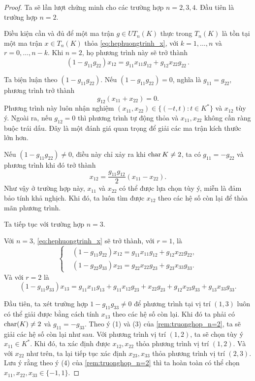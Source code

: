 \begin{proof}

Ta sẽ lần lượt chứng minh cho các trường hợp $n=2,3,4.$ Đầu tiên là trường hợp $n=2$.

    Điều kiện cần và đủ để một ma trận $g\in UT_n(K)$ thực trong $T_n(K)$ là tồn tại một ma trận $x\in T_n(K)$ thỏa \cref{eq:hephuongtrinh_x},
    với \(k = 1,\dots,n\) và \(r = 0,\dots,n-k\). Khi \(n = 2\), họ phương trình này sẽ trở thành
    \[
        (1 - g_{11} g_{22}) x_{12} = g_{11} x_{11} g_{12} + g_{12} x_{22} g_{22}\,.
    \]
    
    Ta biện luận theo \((1 - g_{11} g_{22})\). Nếu \((1 - g_{11} g_{22}) = 0\), nghĩa là $g_{11} = g_{22}$, phương trình trở thành
    \[
        g_{12}(x_{11} + x_{22}) = 0.
    \]
    Phương trình này luôn nhận nghiệm \( (x_{11}, x_{22}) \in \{(-t,t): t \in K^*\} \) và $x_{12}$ tùy ý. Ngoài ra, nếu $g_{12} = 0$ thì phương trình tự động thỏa và $x_{11}, x_{22}$ không cần ràng buộc trái dấu. Đây là một đánh giá quan trọng để giải các ma trận kích thước lớn hơn. 
    
    Nếu $(1 - g_{11} g_{22}) \neq 0$, điều này chỉ xảy ra khi $\operatorname{char}{K} \neq 2$, ta có $g_{11} = -g_{22}$ và phương trình khi đó trở thành
    \[
        x_{12} = \frac{g_{11} g_{12}}{2} (x_{11} - x_{22}).
    \]
    Như vậy ở trường hợp này, $x_{11}$ và $x_{22}$ có thể được lựa chọn tùy ý, miễn là đảm bảo tính khả nghịch. Khi đó, ta luôn tìm được $x_{12}$ theo các hệ số còn lại để thỏa mãn phương trình.

Ta tiếp tục với trường hợp $n = 3$.

    Với $n = 3$, \cref{eq:hephuongtrinh_x} sẽ trở thành, với $r = 1$, là
    \[
        \left\{ \begin{aligned}
        &(1 - g_{11} g_{22}) x_{12} = g_{11} x_{11} g_{12} + g_{12} x_{22} g_{22}, \\
        &(1 - g_{22} g_{33}) x_{23} = g_{22} x_{22} g_{23} + g_{23} x_{33} g_{33}.
        \end{aligned} \right.
    \]
    Và với $r = 2$ là
    \[
        (1 - g_{11} g_{33}) x_{13} = g_{11} x_{11} g_{13} + g_{11} x_{12} g_{23}
        + x_{22} g_{23} + g_{12} x_{23} g_{33} + g_{13} x_{33} g_{33}.
    \]
    
    Đầu tiên, ta xét trường hợp $1 - g_{11} g_{33} \neq 0$ để phương trình tại vị trí $(1,3)$ luôn có thể giải được bằng cách tính $x_{13}$ theo các hệ số còn lại. Khi đó ta phải có $\operatorname{char}(K) \neq 2$ và $g_{11} = -g_{33}$. Theo ý (1) và (3) của \cref{rem:truonghop_n=2}, ta sẽ giải các hệ số còn lại như sau. Với phương trình vị trí $(1,2)$, ta sẽ chọn tùy ý $x_{11} \in K^*$. Khi đó, ta xác định được $x_{12}, x_{22}$ thỏa phương trình vị trí $(1,2)$. Và với $x_{22}$ như trên, ta lại tiếp tục xác định $x_{23}, x_{33}$ thỏa phương trình vị trí $(2,3)$. Lưu ý rằng theo ý (4) của \cref{rem:truonghop_n=2} thì ta hoàn toàn có thể chọn $x_{11},x_{22},x_{33} \in \{-1,1\}$.


\end{proof}
